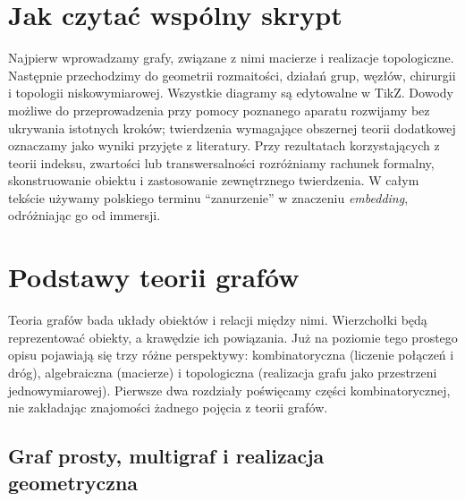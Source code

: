 
\chapter*{Jak czytać wspólny skrypt}
Najpierw wprowadzamy grafy, związane z nimi macierze i realizacje topologiczne.
Następnie przechodzimy do geometrii rozmaitości, działań grup,
węzłów, chirurgii i topologii niskowymiarowej.
Wszystkie diagramy są edytowalne w TikZ. Dowody możliwe do przeprowadzenia
przy pomocy poznanego aparatu rozwijamy bez ukrywania istotnych kroków;
twierdzenia wymagające obszernej teorii dodatkowej oznaczamy jako
wyniki przyjęte z literatury. Przy rezultatach korzystających z teorii
indeksu, zwartości lub transwersalności rozróżniamy rachunek formalny,
skonstruowanie obiektu i zastosowanie zewnętrznego twierdzenia.
W całym tekście używamy polskiego terminu ``zanurzenie'' w znaczeniu
\emph{embedding}, odróżniając go od immersji.

\chapter{Podstawy teorii grafów}
\label{ch:tg-podstawy}

Teoria grafów bada układy obiektów i relacji między nimi. Wierzchołki będą
reprezentować obiekty, a krawędzie ich powiązania. Już na poziomie tego
prostego opisu pojawiają się trzy różne perspektywy: kombinatoryczna
(liczenie połączeń i dróg), algebraiczna (macierze) i topologiczna
(realizacja grafu jako przestrzeni jednowymiarowej). Pierwsze dwa rozdziały
poświęcamy części kombinatorycznej, nie zakładając znajomości żadnego
pojęcia z teorii grafów.

\section{Graf prosty, multigraf i realizacja geometryczna}
\label{sec:tg-obiekty}

